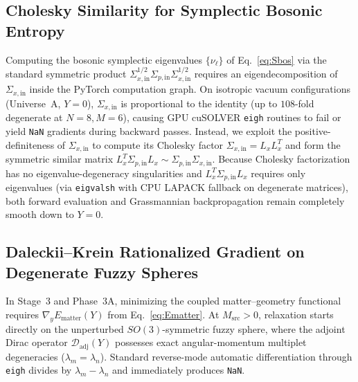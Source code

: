 \documentclass[11pt,a4paper]{article}
\begin{document}
\subsection{Cholesky Similarity for Symplectic Bosonic Entropy}
Computing the bosonic symplectic eigenvalues $\{\nu_\ell\}$ of Eq.~\eqref{eq:Sbos} via the standard symmetric product $\Sigma_{x,\mathrm{in}}^{1/2}\Sigma_{p,\mathrm{in}}\Sigma_{x,\mathrm{in}}^{1/2}$ requires an eigendecomposition of $\Sigma_{x,\mathrm{in}}$ inside the PyTorch computation graph. On isotropic vacuum configurations (Universe~A, $Y=0$), $\Sigma_{x,\mathrm{in}}$ is proportional to the identity (up to $108$-fold degenerate at $N=8, M=6$), causing GPU cuSOLVER \texttt{eigh} routines to fail or yield \texttt{NaN} gradients during backward passes. Instead, we exploit the positive-definiteness of $\Sigma_{x,\mathrm{in}}$ to compute its Cholesky factor $\Sigma_{x,\mathrm{in}} = L_x L_x^T$ and form the symmetric similar matrix $L_x^T \Sigma_{p,\mathrm{in}} L_x \sim \Sigma_{p,\mathrm{in}}\Sigma_{x,\mathrm{in}}$. Because Cholesky factorization has no eigenvalue-degeneracy singularities and $L_x^T \Sigma_{p,\mathrm{in}} L_x$ requires only eigenvalues (via \texttt{eigvalsh} with CPU LAPACK fallback on degenerate matrices), both forward evaluation and Grassmannian backpropagation remain completely smooth down to $Y=0$.

\subsection{Daleckii--Krein Rationalized Gradient on Degenerate Fuzzy Spheres}
In Stage~3 and Phase~3A, minimizing the coupled matter--geometry functional requires $\nabla_y E_{\mathrm{matter}}(Y)$ from Eq.~\eqref{eq:Ematter}. At $M_{\mathrm{src}}>0$, relaxation starts directly on the unperturbed $SO(3)$-symmetric fuzzy sphere, where the adjoint Dirac operator $\mathcal{D}_{\mathrm{adj}}(Y)$ possesses exact angular-momentum multiplet degeneracies ($\lambda_m = \lambda_n$). Standard reverse-mode automatic differentiation through \texttt{eigh} divides by $\lambda_m - \lambda_n$ and immediately produces \texttt{NaN}.
\end{document}
